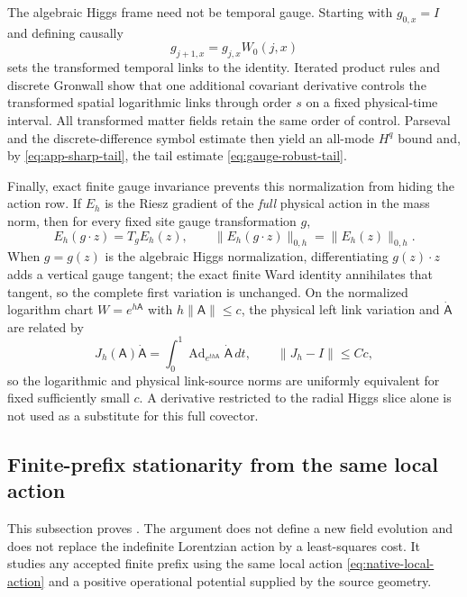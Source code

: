 \documentclass[11pt]{article}
\numberwithin{equation}{section}
\theoremstyle{definition}
\theoremstyle{remark}
\newcommand{\norm}[1]{\lVert#1\rVert}
\begin{document}
The algebraic Higgs frame need not be temporal gauge.  Starting with $g_{0,x}=I$ and defining causally
\begin{equation}
 g_{j+1,x}=g_{j,x}W_0(j,x)
 \label{eq:gauge-temporal}
\end{equation}
sets the transformed temporal links to the identity.  Iterated product rules and discrete Gronwall show that one additional covariant derivative controls the transformed spatial logarithmic links through order $s$ on a fixed physical-time interval.  All transformed matter fields retain the same order of control.  Parseval and the discrete-difference symbol estimate then yield an all-mode $H^q$ bound and, by \eqref{eq:app-sharp-tail}, the tail estimate \eqref{eq:gauge-robust-tail}.

Finally, exact finite gauge invariance prevents this normalization from hiding the action row.  If $E_h$ is the Riesz gradient of the \emph{full} physical action in the mass norm, then for every fixed site gauge transformation $g$,
\begin{equation}
 E_h(g\cdot z)=T_gE_h(z),\qquad \norm{E_h(g\cdot z)}_{0,h}=\norm{E_h(z)}_{0,h}.
 \label{eq:gauge-full-covector}
\end{equation}
When $g=g(z)$ is the algebraic Higgs normalization, differentiating $g(z)\cdot z$ adds a vertical gauge tangent; the exact finite Ward identity annihilates that tangent, so the complete first variation is unchanged.  On the normalized logarithm chart $W=e^{h\mathsf A}$ with $h\norm{\mathsf A}\le c$, the physical left link variation and $\dot{\mathsf A}$ are related by
\begin{equation}
 J_h(\mathsf A)\dot{\mathsf A}
 =\int_0^1\operatorname{Ad}_{e^{th\mathsf A}}\dot{\mathsf A}\,dt,
 \qquad \norm{J_h-I}\le Cc,
 \label{eq:gauge-log-source}
\end{equation}
so the logarithmic and physical link-source norms are uniformly equivalent for fixed sufficiently small $c$.  A derivative restricted to the radial Higgs slice alone is not used as a substitute for this full covector.

\subsection{Finite-prefix stationarity from the same local action}
\label{app:prefix-stationarity}

This subsection proves .  The argument does not define a new field evolution and does not replace the indefinite Lorentzian action by a least-squares cost.  It studies any accepted finite prefix using the same local action \eqref{eq:native-local-action} and a positive operational potential supplied by the source geometry.
\end{document}
